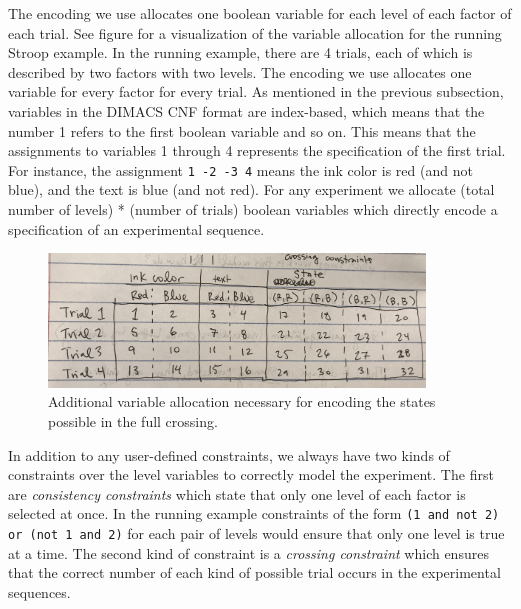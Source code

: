 The encoding we use allocates one boolean variable for each level of each factor of each trial. See figure  for a visualization of the variable allocation for the running Stroop example. In the running example, there are 4 trials, each of which is described by two factors with two levels. The encoding we use allocates one variable for every factor for every trial. As mentioned in the previous subsection, variables in the DIMACS CNF format are index-based, which means that the number 1 refers to the first boolean variable and so on. This means that the assignments to variables 1 through 4 represents the specification of the first trial. For instance, the assignment \texttt{1 -2 -3 4} means the ink color is red (and not blue), and the text is blue (and not red). For any experiment we allocate (total number of levels) * (number of trials) boolean variables which directly encode a specification of an experimental sequence.

\begin{figure}[t]
    \centerline{\includegraphics[origin=c,width=10cm]{stroop_crossing_vars}}
    \caption{Additional variable allocation necessary for encoding the states possible in the full crossing.}%
    \label{fig:stroop_crossing_vars}%
\end{figure}

In addition to any user-defined constraints, we always have two kinds of constraints over the level variables to correctly model the experiment. The first are \emph{consistency constraints} which state that only one level of each factor is selected at once. In the running example constraints of the form \texttt{(1 and not 2) or (not 1 and 2)} for each pair of levels would ensure that only one level is true at a time. The second kind of constraint is a \emph{crossing constraint} which ensures that the correct number of each kind of possible trial occurs in the experimental sequences.

